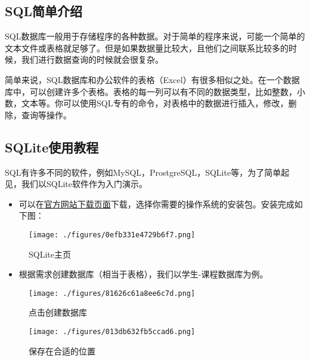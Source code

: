 
\subsection{SQL简单介绍}
SQL数据库一般用于存储程序的各种数据。对于简单的程序来说，可能一个简单的文本文件或表格就足够了。但是如果数据量比较大，且他们之间联系比较多的时候，我们进行数据查询的时候就会很复杂。

简单来说，SQL数据库和办公软件的表格（Excel）有很多相似之处。在一个数据库中，可以创建许多个表格。表格的每一列可以有不同的数据类型，比如整数，小数，文本等。你可以使用SQL专有的命令，对表格中的数据进行插入，修改，删除，查询等操作。

\subsection{SQLite使用教程}
SQL有许多不同的软件，例如MySQL，ProstgreSQL，SQLite等，为了简单起见，我们以SQLite软件作为入门演示。

\begin{itemize}
\item 可以在\href{https://sqlitebrowser.org/dl/}{官方网站下载页面}下载，选择你需要的操作系统的安装包。安装完成如下图：
\end{itemize}

\begin{figure}[ht]
\centering
\texttt{[image: ./figures/0efb331e4729b6f7.png]}
\caption{SQLite主页} \label{fig_SQLint_1}
\end{figure}

\begin{itemize}
\item 根据需求创建数据库（相当于表格），我们以学生-课程数据库为例。
\end{itemize}
\begin{figure}[ht]
\centering
\texttt{[image: ./figures/81626c61a8ee6c7d.png]}
\caption{点击创建数据库} \label{fig_SQLint_2}
\end{figure}
\begin{figure}[ht]
\centering
\texttt{[image: ./figures/013db632fb5ccad6.png]}
\caption{保存在合适的位置} \label{fig_SQLint_3}
\end{figure}

